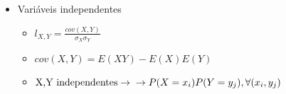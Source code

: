 \documentclass{article}
\begin{document}
\begin{multicols*}{2}
\begin{itemize}
    \item{Variáveis independentes}
    \begin{itemize}
        \item $l_{X,Y}=\frac{cov(X,Y)}{\sigma_X \sigma_Y}$
        \item $cov(X,Y)=E(XY)-E(X)E(Y)$
        \item $\text{X,Y independentes} \rightarrow \newline \rightarrow P(X=x_i)P(Y=y_j), \forall(x_i, y_j)$
    \end{itemize}    

\end{itemize}
\end{multicols*}
\end{document}
